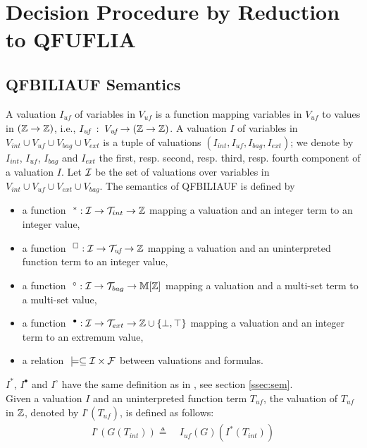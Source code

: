 
\section{Decision Procedure by Reduction to \textsf{QFUFLIA}}
\label{app:forder}

\subsection{QFBILIAUF Semantics}
\label{ssec:semUF}
A valuation $I_{\textit{uf}}$ of variables in $V_{\textit{uf}}$ is a function mapping variables in $V_{\textit{uf}}$ to values in $(\mathbb{Z} \rightarrow \mathbb{Z})$, i.e.,
$I_{\textit{uf}} \; : \; V_{\textit{uf}} \rightarrow (\mathbb{Z} \rightarrow \mathbb{Z})$.
A valuation $I$ of variables in $V_{int}\cup V_{\textit{uf}} \cup V_{bag} \cup V_{ext}$ is a tuple of valuations $(I_{int}, I_{\textit{uf}}, I_{bag}, I_{ext})$;
we denote by $I_{int}$, $I_{\textit{uf}}$, $I_{bag}$ and $I_{ext}$ the first, resp. second, resp. third, resp. fourth component of a valuation $I$.
Let $\mathcal{I}$ be the set of valuations over variables in $V_{int}\cup V_{\textit{uf}} \cup V_{ext} \cup V_{bag}$.
The semantics of QFBILIAUF is defined by
\begin{itemize}
\item a function $\ ^*: \mathcal{I}\rightarrow \mathcal{T}_{int}\rightarrow \mathbb{Z}$ mapping a valuation and an integer term to an integer value,
\item a function $\ ^\square: \mathcal{I}\rightarrow \mathcal{T}_{\textit{uf}}\rightarrow \mathbb{Z} $ mapping a valuation and an uninterpreted function term to an integer value,
\item a function $\ ^\circ: \mathcal{I}\rightarrow \mathcal{T}_{bag}\rightarrow \mathbb{M}[\mathbb{Z}]$ mapping a valuation and a multi-set term to a multi-set value,
\item a function $\ ^{\bullet}: \mathcal{I}\rightarrow \mathcal{T}_{ext}\rightarrow \mathbb{Z}\cup\{\bot,\top\}$ mapping a valuation and an integer term to an extremum value,
\item a relation $\ \models \subseteq \mathcal{I}\times \mathcal{F}$ between valuations and formulas.
\end{itemize}
$I^{*}$, $I^{\bullet}$ and $I^{\circ}$ have the same definition as in \QFBILIA, see section \ref{ssec:sem}.
\\
Given a valuation $I$ and an uninterpreted function term $T_{\textit{uf}}$, the valuation of $T_{\textit{uf}}$ in $\mathbb{Z}$,
denoted by $I^{\square}(T_{\textit{uf}})$, is defined as follows:
\begin{align*}
I^{\square}(G(T_{int})) \triangleq&\ I_{\textit{uf}}(G)(I^*(T_{int})) \\
\end{align*}

